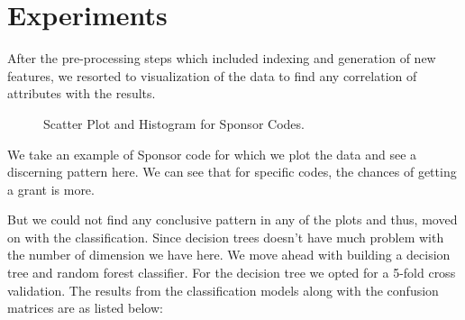 \documentclass{article} %
\begin{document}
	
\section{Experiments}

After the pre-processing steps which included indexing and generation of new features, we resorted to visualization of the data to find any correlation of attributes with the results.

\begin{figure}[h]
	\begin{center}
	\end{center}
	\caption{Scatter Plot and Histogram for Sponsor Codes.}
\end{figure}

We take an example of Sponsor code for which we plot the data and see a discerning pattern here. We can see that for specific codes, the chances of getting a grant is more.

But we could not find any conclusive pattern in any of the plots and thus, moved on with the classification. Since decision trees doesn't have much problem with the number of dimension we have here. We move ahead with building a decision tree and random forest classifier. For the decision tree we opted for a 5-fold cross validation. The results from the classification models along with the confusion matrices are as listed below:
\end{document}
